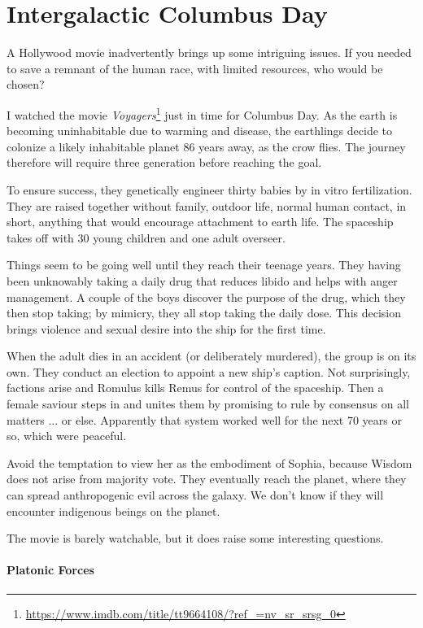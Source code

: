 \section{Intergalactic Columbus Day}

A Hollywood movie inadvertently brings up some intriguing issues. If you needed to save a remnant of the human race, with limited resources, who would be chosen?

I watched the movie \textit{Voyagers}\footnote{\url{https://www.imdb.com/title/tt9664108/?ref\_=nv\_sr\_srsg\_0}} just in time for Columbus Day. As the earth is becoming uninhabitable due to warming and disease, the earthlings decide to colonize a likely inhabitable planet 86 years away, as the crow flies. The journey therefore will require three generation before reaching the goal.

To ensure success, they genetically engineer thirty babies by in vitro fertilization. They are raised together without family, outdoor life, normal human contact, in short, anything that would encourage attachment to earth life. The spaceship takes off with 30 young children and one adult overseer.

Things seem to be going well until they reach their teenage years. They having been unknowably taking a daily drug that reduces libido and helps with anger management. A couple of the boys discover the purpose of the drug, which they then stop taking; by mimicry, they all stop taking the daily dose. This decision brings violence and sexual desire into the ship for the first time.

When the adult dies in an accident (or deliberately murdered), the group is on its own. They conduct an election to appoint a new ship's caption. Not surprisingly, factions arise and Romulus kills Remus for control of the spaceship. Then a female saviour steps in and unites them by promising to rule by consensus on all matters ... or else. Apparently that system worked well for the next 70 years or so, which were peaceful.

Avoid the temptation to view her as the embodiment of Sophia, because Wisdom does not arise from majority vote. They eventually reach the planet, where they can spread anthropogenic evil across the galaxy. We don't know if they will encounter indigenous beings on the planet.

The movie is barely watchable, but it does raise some interesting questions.

\paragraph{Platonic Forces}

